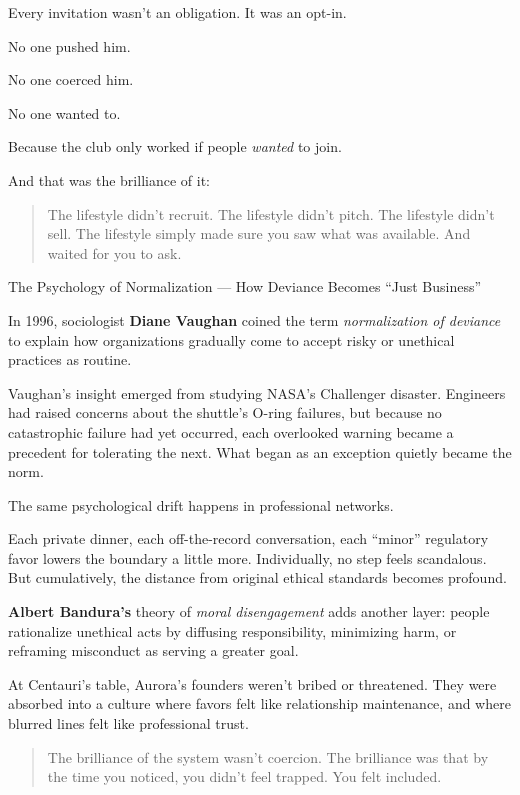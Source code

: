 Every invitation wasn’t an obligation. It was an opt-in.

No one pushed him. 

No one coerced him. 

No one wanted to. 

Because the club only worked if people \textit{wanted} to join.

And that was the brilliance of it:

\begin{quote}
The lifestyle didn’t recruit.  
The lifestyle didn’t pitch.  
The lifestyle didn’t sell.  
The lifestyle simply made sure you saw what was available.  
And waited for you to ask.
\end{quote}

\begin{PsychologicalSidebar}{The Psychology of Normalization --- How Deviance Becomes ``Just Business''}

  In 1996, sociologist \textbf{Diane Vaughan} coined the term \emph{normalization of deviance} to explain how 
  organizations gradually come to accept risky or unethical practices as routine.

  \medskip
  
  Vaughan’s insight emerged from studying NASA’s Challenger disaster. Engineers had raised concerns about the 
  shuttle’s O-ring failures, but because no catastrophic failure had yet occurred, each overlooked warning became 
  a precedent for tolerating the next. What began as an exception quietly became the norm.

  \medskip
  
  The same psychological drift happens in professional networks.

  \medskip
  
  Each private dinner, each off-the-record conversation, each “minor” regulatory favor lowers the boundary a little more. 
  Individually, no step feels scandalous. But cumulatively, the distance from original ethical standards becomes profound.

  \medskip
  
  \textbf{Albert Bandura’s} theory of \emph{moral disengagement} adds another layer: people rationalize unethical acts by 
  diffusing responsibility, minimizing harm, or reframing misconduct as serving a greater goal.

  \medskip
  
  At Centauri’s table, Aurora’s founders weren’t bribed or threatened. They were absorbed into 
  a culture where favors felt like relationship maintenance, and where blurred lines felt like professional trust.
  
  \begin{quote}
  The brilliance of the system wasn’t coercion.  The brilliance was that by the time you noticed, you didn’t feel trapped.  
  You felt included.
  \end{quote}
  
\end{PsychologicalSidebar}

